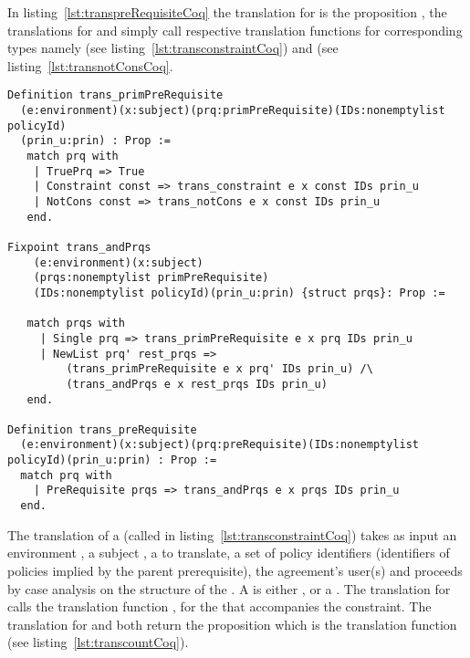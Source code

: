 In listing~\ref{lst:transpreRequisiteCoq} the translation for  is the proposition , the translations for  and  simply call respective translation functions for corresponding types namely  (see listing~\ref{lst:transconstraintCoq}) and  (see listing~\ref{lst:transnotConsCoq}. 


\begin{minipage}[c]{0.95\textwidth}
\begin{lstlisting}
Definition trans_primPreRequisite
  (e:environment)(x:subject)(prq:primPreRequisite)(IDs:nonemptylist policyId)
  (prin_u:prin) : Prop :=
   match prq with
    | TruePrq => True
    | Constraint const => trans_constraint e x const IDs prin_u
    | NotCons const => trans_notCons e x const IDs prin_u
   end.

Fixpoint trans_andPrqs
    (e:environment)(x:subject)
    (prqs:nonemptylist primPreRequisite)
    (IDs:nonemptylist policyId)(prin_u:prin) {struct prqs}: Prop :=
   
   match prqs with
     | Single prq => trans_primPreRequisite e x prq IDs prin_u 
     | NewList prq' rest_prqs => 
         (trans_primPreRequisite e x prq' IDs prin_u) /\
         (trans_andPrqs e x rest_prqs IDs prin_u)
   end.

Definition trans_preRequisite
  (e:environment)(x:subject)(prq:preRequisite)(IDs:nonemptylist policyId)(prin_u:prin) : Prop :=
  match prq with
    | PreRequisite prqs => trans_andPrqs e x prqs IDs prin_u
  end.
\end{lstlisting}
\end{minipage}

The translation of a  (called  in listing~\ref{lst:transconstraintCoq}) takes as input 
an environment \syn{e}, a subject \syn{x}, a \syn{constraint} \syn{const} to translate, a set of policy identifiers \syn{IDs} (identifiers of policies implied by the parent prerequisite), the agreement's user(s)  and proceeds by case analysis on the structure of the . A  is either ,  or a . The translation for  calls the translation function , for the  that accompanies the  constraint. The translation for  and  both return the proposition which is the translation function  (see listing~\ref{lst:transcountCoq}).


